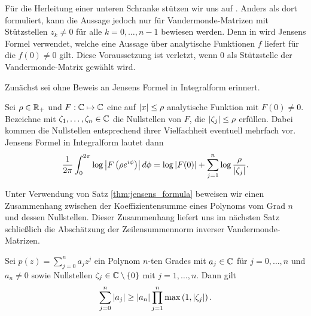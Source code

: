 \noindent Für die Herleitung einer unteren Schranke stützen wir uns auf \cite{gautschi2}.
Anders als dort formuliert, kann die Aussage jedoch nur für
Vandermonde-Matrizen mit Stützstellen $z_k \neq 0$ für alle $k = 0, \dots, n-1$
bewiesen werden.
Denn in \cite{gautschi2} wird Jensens Formel verwendet, welche eine Aussage
über analytische Funktionen $f$ liefert für die $f(0) \neq 0$ gilt.
Diese Voraussetzung ist verletzt, wenn $0$ als Stützstelle der
Vandermonde-Matrix gewählt wird.

Zunächst sei ohne Beweis an Jensens Formel in Integralform erinnert.
\begin{theorem}
    \label{thm:jensens_formula}
    Sei $\rho \in \mathbb{R}_+$ und $F: \mathbb{C} \mapsto \mathbb{C}$ eine auf $\left\lvert x \right\rvert \leq \rho$
    analytische Funktion mit $F(0) \neq 0$.
    Bezeichne mit $\zeta_1, \dots, \zeta_n \in \mathbb{C}$ die Nullstellen von $F$, die
    $\left\lvert \zeta_j \right\rvert \leq \rho$ erfüllen.
    Dabei kommen die Nullstellen entsprechend ihrer Vielfachheit eventuell mehrfach
    vor.
    Jensens Formel in Integralform lautet dann
    \begin{equation}
        \frac{1}{2\pi} \int_{0}^{2 \pi} \log \left\lvert F\left( \rho e^{i\phi} \right) \right\rvert d\phi
        = \log \left\lvert F(0) \right\rvert + \sum_{j=1}^{n} \log \frac{\rho}{\left\lvert \zeta_j \right\rvert}.
    \end{equation}
\end{theorem}

\noindent Unter Verwendung von Satz \ref{thm:jensens_formula} beweisen
wir einen Zusammenhang zwischen der Koeffizientensumme eines Polynoms vom Grad
$n$ und dessen Nullstellen.
Dieser Zusammenhang liefert uns im nächsten Satz schließlich die Abschätzung
der Zeilensummennorm inverser Vandermonde-Matrizen.
\begin{lemma}
    \label{lemma:polynom_coefficient_sum_inequality}
    Sei $p(z) = \sum_{j = 0}^{n} a_j z^j$ ein Polynom $n$-ten Grades mit
    $a_j \in \mathbb{C}$ für $j = 0, \dots, n$ und $a_n \neq 0$ sowie Nullstellen
    $\zeta_j \in \mathbb{C}\setminus\{0\}$ mit $j = 1, \dots, n$.
    Dann gilt
    \begin{equation}
        \label{eq:polynom_coefficient_sum_inequality}
        \sum_{j=0}^{n} \left\lvert a_j \right\rvert \geq \left\lvert a_n \right\rvert \prod_{j=1}^{n} \max \left(1, \left\lvert \zeta_j \right\rvert \right).
    \end{equation}
\end{lemma}

